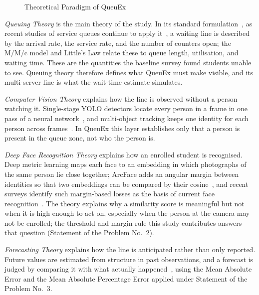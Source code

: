 \documentclass{research}
\newcommand{\sysname}{QueuEx}
\begin{document}
\begin{figure}[!htbp]
  \caption{Theoretical Paradigm of \sysname{}}
  \label{fig:theoretical-framework}
\end{figure}

\emph{Queuing Theory} is the main theory of the study. In its standard
formulation~\cite{shortle2018fundamentals}, as recent studies of service
queues continue to apply it~\cite{yifter2023modeling}, a waiting line is
described by the arrival rate, the service rate, and the number of
counters open; the M/M/c model and Little's Law relate these to queue
length, utilisation, and waiting time. These are the quantities the
baseline survey found students unable to see. Queuing theory therefore
defines what \sysname{} must make visible, and its multi-server line is
what the wait-time estimate simulates.

\emph{Computer Vision Theory} explains how the line is observed without
a person watching it. Single-stage YOLO detectors locate every person in
a frame in one pass of a neural network~\cite{jocher2023}, and
multi-object tracking keeps one identity for each person across
frames~\cite{zhang2022bytetrack}. In \sysname{} this layer establishes
only that a person is present in the queue zone, not who the person is.

\emph{Deep Face Recognition Theory} explains how an enrolled student is
recognised. Deep metric learning maps each face to an embedding in which
photographs of the same person lie close together; ArcFace adds an
angular margin between identities so that two embeddings can be compared
by their cosine~\cite{deng2019arcface}, and recent surveys identify such
margin-based losses as the basis of current face
recognition~\cite{wang2021deepfacesurvey}. The theory explains why a
similarity score is meaningful but not when it is high enough to act on,
especially when the person at the camera may not be enrolled; the
threshold-and-margin rule this study contributes answers that question
(Statement of the Problem No.~2).

\emph{Forecasting Theory} explains how the line is anticipated rather
than only reported. Future values are estimated from structure in past
observations, and a forecast is judged by comparing it with what
actually happened~\cite{hyndman2021forecasting}, using the Mean Absolute
Error and the Mean Absolute Percentage Error applied under Statement of
the Problem No.~3.
\end{document}
